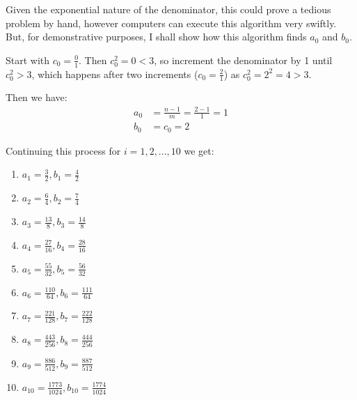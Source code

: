 \documentclass[12pt, letterpaper]{article}
\begin{document}
\noindent Given the exponential nature of the denominator, this could prove a tedious problem by hand, however computers can execute this algorithm very swiftly.
But, for demonstrative purposes, I shall show how this algorithm finds $a_0$ and $b_0$.

Start with $c_0 = \frac{0}{1}$. Then $c_0^2 = 0 < 3$, so increment the denominator by 1 until $c_0^2 > 3$, which happens after two increments ($c_0 = \frac{2}{1}$) as $c_0^2 = 2^2 = 4 > 3$.

\noindent Then we have:
\begin{equation}
\begin{split}
a_0 & = \frac{n - 1}{m} = \frac{2 - 1}{1} = 1 \\
b_0 & = c_0 = 2
\end{split}
\end{equation}

\noindent Continuing this process for $i = 1, 2, ..., 10$ we get:
\begin{enumerate}
  \item $a_1 = \frac{3}{2}, b_1 = \frac{4}{2}$
  \item $a_2 = \frac{6}{4}, b_2 = \frac{7}{4}$
  \item $a_3 = \frac{13}{8}, b_3 = \frac{14}{8}$
  \item $a_4 = \frac{27}{16}, b_4 = \frac{28}{16}$
  \item $a_5 = \frac{55}{32}, b_5 = \frac{56}{32}$
  \item $a_6 = \frac{110}{64}, b_6 = \frac{111}{64}$
  \item $a_7 = \frac{221}{128}, b_7 = \frac{222}{128}$
  \item $a_8 = \frac{443}{256}, b_8 = \frac{444}{256}$
  \item $a_9 = \frac{886}{512}, b_9 = \frac{887}{512}$
  \item $a_{10} = \frac{1773}{1024}, b_{10} = \frac{1774}{1024}$
\end{enumerate}
\pagebreak
\end{document}
